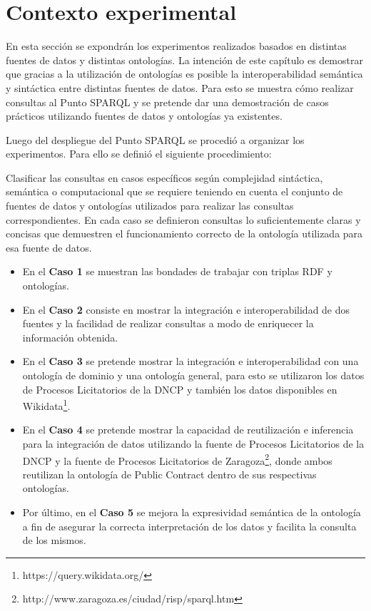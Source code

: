 \chapter{Contexto experimental}
\label{chap:Contexto experimental}


En esta sección se expondrán los experimentos realizados basados en distintas fuentes de datos y distintas ontologías. La intención de este capítulo es demostrar que gracias a la utilización de ontologías es posible la interoperabilidad semántica y sintáctica entre distintas fuentes de datos. Para esto se muestra cómo realizar consultas al Punto SPARQL y se pretende dar una demostración de casos prácticos utilizando fuentes de datos y ontologías ya existentes. 

Luego del despliegue del Punto SPARQL se procedió a organizar los experimentos. Para ello se definió el siguiente procedimiento:

Clasificar las consultas en casos específicos según complejidad sintáctica, semántica o computacional que se requiere teniendo en cuenta el conjunto de fuentes de datos y ontologías utilizados para realizar las consultas correspondientes.
En cada caso se definieron consultas lo suficientemente claras y concisas que demuestren el funcionamiento correcto de la ontología utilizada para esa fuente de datos.

\begin{itemize}
    \item En el \textbf{Caso 1} se muestran las bondades de trabajar con triplas RDF y ontologías.
    \item  En el \textbf{Caso 2} consiste en mostrar la integración e interoperabilidad de dos fuentes y la facilidad de realizar consultas a modo de enriquecer la información obtenida.
    \item En el \textbf{Caso 3} se pretende mostrar la integración e interoperabilidad con una ontología de dominio y una ontología general, para esto se utilizaron los datos de Procesos Licitatorios de la DNCP y también los datos disponibles en Wikidata\footnote{https://query.wikidata.org/}.
    \item En el \textbf{Caso 4} se pretende mostrar la capacidad de reutilización e inferencia para la integración de datos utilizando la fuente de Procesos Licitatorios de la DNCP y la fuente de Procesos Licitatorios de Zaragoza\footnote{http://www.zaragoza.es/ciudad/risp/sparql.htm}, donde ambos reutilizan la ontología de Public Contract dentro de sus respectivas ontologías.
    \item Por último, en el \textbf{Caso 5} se mejora la expresividad semántica de la ontología a fin de asegurar la correcta interpretación de los datos y facilita la consulta de los mismos.
\end{itemize}
  

